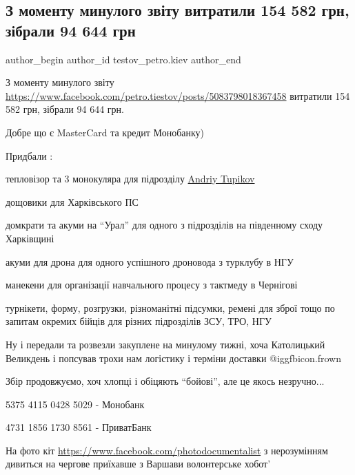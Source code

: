  
 
 
 
 
 
\subsection{З моменту минулого звіту витратили 154 582 грн, зібрали 94 644 грн}
\label{sec:21_04_2022.fb.testov_petro.kiev.1.zvit}
 
\ifcmt
 author_begin
   author_id testov_petro.kiev
 author_end
\fi

З моменту минулого звіту
\url{https://www.facebook.com/petro.tiestov/posts/5083798018367458} витратили
154 582 грн, зібрали 94 644 грн.

Добре що є MasterCard та кредит Монобанку) 

Придбали : 

тепловізор та 3 монокуляра для підрозділу \href{https://www.facebook.com/andriy.tupikov}{Andriy Tupikov}

дощовики для Харківського ПС

домкрати та акуми на \enquote{Урал} для одного з підрозділів на південному сходу
Харківщині 


акуми для дрона для одного успішного дроновода з турклубу в НГУ

манекени для організації навчального процесу з тактмеду в Чернігові

турнікети, форму, розгрузки, різноманітні підсумки, ремені для зброї тощо по
запитам окремих бійців для різних підрозділів ЗСУ, ТРО, НГУ

Ну і передали та розвезли закуплене на минулому тижні, хоча Католицький
Великдень і попсував трохи нам логістику і терміни доставки  @igg{fbicon.frown}  

Збір продовжуємо, хоч хлопці і обіцяють \enquote{бойові}, але це якось незручно...

5375 4115 0428 5029 - Монобанк

4731 1856 1730 8561 - ПриватБанк

На фото кіт \href{Дмитро Демченко Мурзік}{https://www.facebook.com/photodocumentalist} з нерозумінням дивиться на чергове приїхавше
з Варшави волонтерське хобот'
